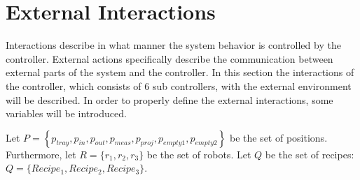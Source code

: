 \section{External Interactions}\label{sec:ext_interactions}
Interactions describe in what manner the system behavior is controlled by the controller.
External actions specifically describe the communication between external parts of the system and the controller.
In this section the interactions of the controller, which consists of $6$ sub controllers, with the external environment will be described.
In order to properly define the external interactions, some variables will be introduced.

Let $P = \left\{p_\mathit{tray}, p_\mathit{in}, p_\mathit{out}, p_\mathit{meas}, p_\mathit{proj}, p_\mathit{empty1}, p_\mathit{empty2}\right\}$ be the set of positions.
Furthermore, let $R = \{r_1,r_2,r_3\}$ be the set of robots.
Let $Q$ be the set of recipes: $Q = \{Recipe_1, Recipe_2, Recipe_3\}$.


